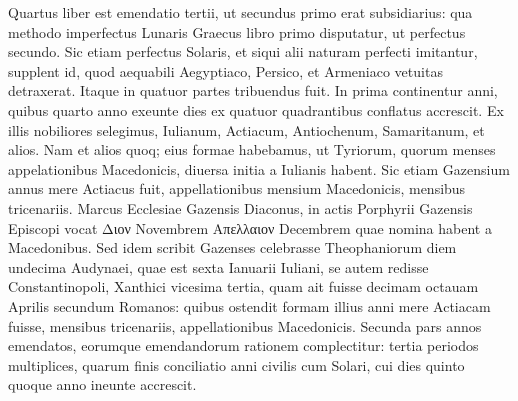 Quartus liber est emendatio
tertii, ut secundus primo erat subsidiarius: qua methodo imperfectus
Lunaris Graecus libro primo disputatur, ut perfectus secundo.
Sic etiam perfectus Solaris, et siqui alii naturam perfecti imitantur,
supplent id, quod aequabili Aegyptiaco, Persico, et Armeniaco
vetuitas detraxerat.
Itaque in quatuor partes tribuendus fuit.
In
prima continentur anni, quibus quarto anno exeunte dies ex quatuor
quadrantibus conflatus accrescit.
Ex illis nobiliores selegimus,
Iulianum, Actiacum, Antiochenum, Samaritanum, et alios. 
Nam et alios quoq; eius formae habebamus, ut Tyriorum, quorum menses
appelationibus Macedonicis, diuersa initia a Iulianis habent.
Sic
etiam Gazensium annus mere Actiacus fuit, appellationibus mensium 
Macedonicis, mensibus tricenariis. 
Marcus Ecclesiae Gazensis Diaconus,
in actis Porphyrii Gazensis Episcopi vocat \textgreek{Διον} Novembrem
\textgreek{Απελλαιον} Decembrem quae nomina habent a Macedonibus. 
Sed
idem scribit Gazenses celebrasse Theophaniorum diem undecima
Audynaei, quae est sexta Ianuarii Iuliani, se autem redisse Constantinopoli,
Xanthici vicesima tertia, quam ait fuisse decimam octauam
Aprilis secundum Romanos: quibus ostendit formam illius anni mere
Actiacam fuisse, mensibus tricenariis, appellationibus Macedonicis. 
{}
Secunda pars annos emendatos, eorumque emendandorum
rationem complectitur: tertia periodos multiplices, quarum finis
conciliatio anni civilis cum Solari, cui dies quinto quoque anno
ineunte accrescit.

